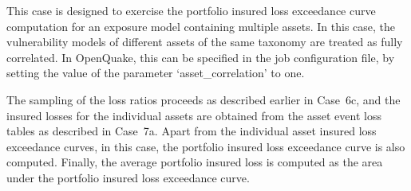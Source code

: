 This case is designed to exercise the portfolio insured loss exceedance curve computation for an exposure model containing multiple assets. In this case, the vulnerability models of different assets of the same taxonomy are treated as fully correlated. In OpenQuake, this can be specified in the job configuration file, by setting the value of the parameter `asset\_correlation' to one.

The sampling of the loss ratios proceeds as described earlier in Case~6c, and the insured losses for the individual assets are obtained from the asset event loss tables as described in Case~7a. Apart from the individual asset insured loss exceedance curves, in this case, the portfolio insured loss exceedance curve is also computed. Finally, the average portfolio insured loss is computed as the area under the portfolio insured loss exceedance curve.